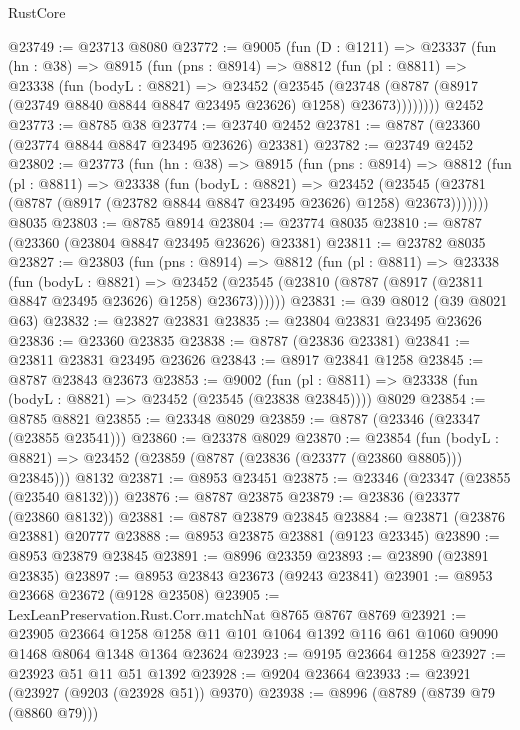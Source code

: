 \begin{lexlean}{RustCore}
\begin{coremodule}
@23749 := @23713 @8080
@23772 := @9005
    (fun (D : @1211) =>
    @23337
      (fun (hn : @38) =>
      @8915
        (fun (pns : @8914) =>
        @8812
          (fun (pl : @8811) =>
          @23338
            (fun (bodyL : @8821) =>
            @23452
              (@23545
                (@23748 (@8787 (@8917 (@23749 @8840 @8844 @8847 @23495 @23626) @1258) @23673))))))))
    @2452
@23773 := @8785 @38
@23774 := @23740 @2452
@23781 := @8787 (@23360 (@23774 @8844 @8847 @23495 @23626) @23381)
@23782 := @23749 @2452
@23802 := @23773
    (fun (hn : @38) =>
    @8915
      (fun (pns : @8914) =>
      @8812
        (fun (pl : @8811) =>
        @23338
          (fun (bodyL : @8821) =>
          @23452
            (@23545 (@23781 (@8787 (@8917 (@23782 @8844 @8847 @23495 @23626) @1258) @23673)))))))
    @8035
@23803 := @8785 @8914
@23804 := @23774 @8035
@23810 := @8787 (@23360 (@23804 @8847 @23495 @23626) @23381)
@23811 := @23782 @8035
@23827 := @23803
    (fun (pns : @8914) =>
    @8812
      (fun (pl : @8811) =>
      @23338
        (fun (bodyL : @8821) =>
        @23452 (@23545 (@23810 (@8787 (@8917 (@23811 @8847 @23495 @23626) @1258) @23673))))))
@23831 := @39 @8012 (@39 @8021 @63)
@23832 := @23827 @23831
@23835 := @23804 @23831 @23495 @23626
@23836 := @23360 @23835
@23838 := @8787 (@23836 @23381)
@23841 := @23811 @23831 @23495 @23626
@23843 := @8917 @23841 @1258
@23845 := @8787 @23843 @23673
@23853 := @9002
    (fun (pl : @8811) => @23338 (fun (bodyL : @8821) => @23452 (@23545 (@23838 @23845))))
    @8029
@23854 := @8785 @8821
@23855 := @23348 @8029
@23859 := @8787 (@23346 (@23347 (@23855 @23541)))
@23860 := @23378 @8029
@23870 := @23854
    (fun (bodyL : @8821) => @23452 (@23859 (@8787 (@23836 (@23377 (@23860 @8805))) @23845)))
    @8132
@23871 := @8953 @23451
@23875 := @23346 (@23347 (@23855 (@23540 @8132)))
@23876 := @8787 @23875
@23879 := @23836 (@23377 (@23860 @8132))
@23881 := @8787 @23879 @23845
@23884 := @23871 (@23876 @23881) @20777
@23888 := @8953 @23875 @23881 (@9123 @23345)
@23890 := @8953 @23879 @23845
@23891 := @8996 @23359
@23893 := @23890 (@23891 @23835)
@23897 := @8953 @23843 @23673 (@9243 @23841)
@23901 := @8953 @23668 @23672 (@9128 @23508)
@23905 := LexLeanPreservation.Rust.Corr.matchNat @8765 @8767 @8769
@23921 := @23905
    @23664
    @1258
    @1258
    @11
    @101
    @1064
    @1392
    @116
    @61
    @1060
    @9090
    @1468
    @8064
    @1348
    @1364
    @23624
@23923 := @9195 @23664 @1258
@23927 := @23923 @51 @11 @51 @1392
@23928 := @9204 @23664
@23933 := @23921 (@23927 (@9203 (@23928 @51)) @9370)
@23938 := @8996 (@8789 (@8739 @79 (@8860 @79)))

\end{coremodule}
\end{lexlean}
